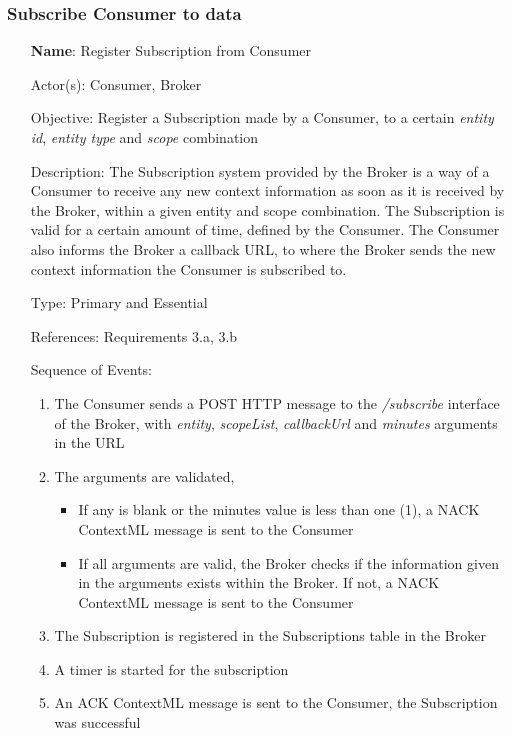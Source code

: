 \subsubsection{Subscribe Consumer to data}
\begin{itemize}
	\item[\textbf{Name}:] Register Subscription from Consumer
	\item[Actor(s):] Consumer, Broker
	\item[Objective:] Register a Subscription made by a Consumer, to a certain \textit{entity id}, \textit{entity type} and \textit{scope} combination
	\item[Description:] The Subscription system provided by the Broker is a way of a Consumer to receive any new context information as soon as it is received by the Broker, within a given entity and scope combination. The Subscription is valid for a certain amount of time, defined by the Consumer. The Consumer also informs the Broker a callback URL, to where the Broker sends the new context information the Consumer is subscribed to.
	\item[Type:] Primary and Essential
	\item[References:] Requirements 3.a, 3.b 
	\item[Sequence of Events:]\hfill
	\begin{enumerate}
		\item The Consumer sends a POST HTTP message to the \textit{/subscribe} interface of the Broker, with \textit{entity}, \textit{scopeList}, \textit{callbackUrl} and \textit{minutes} arguments in the URL
		\item The arguments are validated, 
		\begin{itemize}
			\item If any is blank or the minutes value is less than one (1), a NACK ContextML message is sent to the Consumer
			\item If all arguments are valid, the Broker checks if the information given in the arguments exists within the Broker. If not, a NACK ContextML message is sent to the Consumer
		\end{itemize}
		\item The Subscription is registered in the Subscriptions table in the Broker
		\item A timer is started for the subscription
		\item An ACK ContextML message is sent to the Consumer, the Subscription was successful
	\end{enumerate}
\end{itemize}

